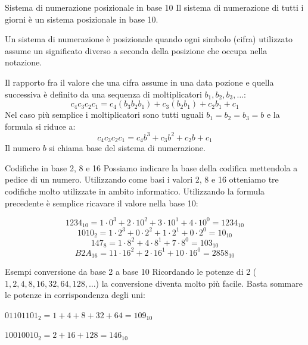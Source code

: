 \documentclass[aspectratio=169, ]{beamer}
\begin{document}
\begin{frame}{Sistema di numerazione posizionale in base 10}
Il sistema di numerazione di tutti i giorni è un sistema \alert{posizionale} in \alert{base 10}.

\pause
Un sistema di numerazione è \alert{posizionale} quando ogni simbolo (cifra) utilizzato assume un significato diverso a seconda della posizione che occupa nella notazione.

\pause
Il rapporto fra il valore che una cifra assume in una data pozione e quella successiva è definito da una sequenza di moltiplicatori $b_1, b_2, b_3, \dots$:
\[c_4c_3c_2c_1 = c_4(b_3b_2b_1) + c_3(b_2b_1) + c_2b_1 + c_1\]
\pause
Nel caso più semplice i moltiplicatori sono tutti uguali $b_1 = b_2 = b_3 = b$ e la formula si riduce a:
\[c_4c_3c_2c_1 = c_4b^3 + c_3b^2 + c_2b + c_1\]
Il numero $b$ si chiama \alert{base} del sistema di numerazione.
\end{frame}

\begin{frame}{Codifiche in base 2, 8 e 16}
Possiamo indicare la base della codifica mettendola a pedice di un numero.
Utilizzando come basi i valori 2, 8 e 16 otteniamo tre codifiche molto utilizzate in ambito informatico.
Utilizzando la formula precedente è semplice ricavare il valore nella base 10:

\[1234_{10} = 1\cdot0^3 + 2\cdot10^2 + 3\cdot10^1 + 4\cdot10^0 = 1234_{10}\]
\pause
\[1010_{2}  = 1\cdot2^3  + 0\cdot2^2  + 1\cdot2^1  + 0\cdot2^0 = 10_{10}\]
\pause
\[147_8 = 1\cdot8^2 + 4\cdot8^1 + 7\cdot8^0 = 103_{10}\]
\pause
\[B2A_{16} = 11\cdot16^2 + 2\cdot16^1 + 10\cdot16^0 = 2858_{10}\]
\end{frame}

\begin{frame}{Esempi conversione da base 2 a base 10}
Ricordando le potenze di 2 ($1,2,4,8,16,32,64,128,\dots$) la conversione diventa molto più facile. Basta sommare le potenze in corrispondenza degli uni:

$01101101_2 = 1+4+8+32+64 = 109_{10}$

$10010010_2 = 2+16+128 = 146_{10}$
\end{frame}
\end{document}
